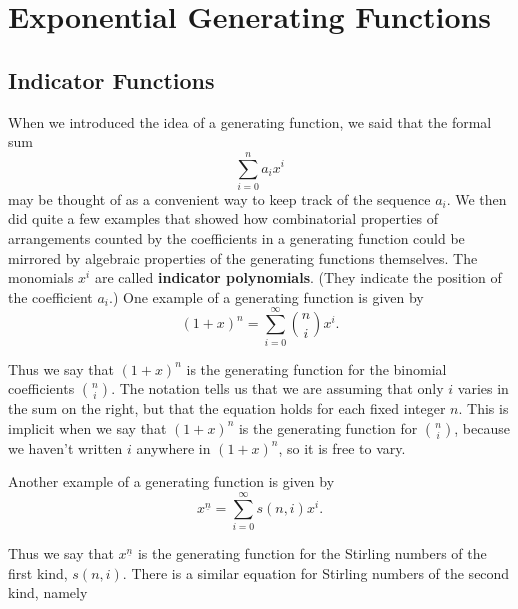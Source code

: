 \documentclass[10pt,]{book}
\newcommand{\terminology}[1]{\textbf{#1}}
\theoremstyle{plain}
\theoremstyle{definition}
\theoremstyle{definition}
\numberwithin{equation}{chapter}
\begin{document}
\typeout{************************************************}
\typeout{************************************************}
\chapter[{Exponential Generating Functions}]{Exponential Generating Functions}\label{expogenfun}
\typeout{************************************************}
\typeout{************************************************}
\section[{Indicator Functions}]{Indicator Functions}\label{app3-1-indicator}
\hypertarget{p-2036}{}%
When we introduced the idea of a generating function, we said that the formal sum%
\begin{equation*}
\sum_{i=0}^n a_ix^i
\end{equation*}
may be thought of as a convenient way to keep track of the sequence \(a_i\). We then did quite a few examples that showed how combinatorial properties of arrangements counted by the coefficients in a generating function could be mirrored by algebraic properties of the generating functions themselves. The monomials \(x^i\) are called \terminology{indicator polynomials}. (They indicate the position of the coefficient \(a_i\).) One example of a generating function is given by%
\begin{equation*}
(1+x)^n = \sum_{i=0}^\infty \binom{n}{i}x^i.
\end{equation*}
%
\par
\hypertarget{p-2037}{}%
Thus we say that \((1+x)^n\) is the generating function for the binomial coefficients \(\binom{n}{i}\). The notation tells us that we are assuming that only \(i\) varies in the sum on the right, but that the equation holds for each fixed integer \(n\). This is implicit when we say that \((1+x)^n\) is the generating function for \(\binom{n}{i}\), because we haven't written \(i\) anywhere in \((1+x)^n\), so it is free to vary.%
\par
\hypertarget{p-2038}{}%
Another example of a generating function is given by%
\begin{equation*}
x^{\underline{n}} = \sum_{i=0}^\infty s(n,i)x^i.
\end{equation*}
%
\par
\hypertarget{p-2039}{}%
Thus we say that \(x^{\underline{n}}\) is the generating function for the Stirling numbers of the first kind, \(s(n,i)\). There is a similar equation for Stirling numbers of the second kind, namely%
\end{document}
